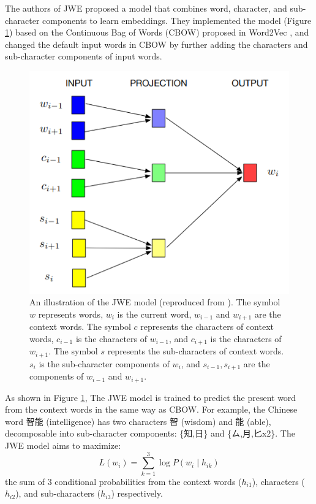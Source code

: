 The authors of JWE \cite{yu2017joint} proposed a model that combines word, character, and sub-character components to learn embeddings. They implemented the model (Figure \ref{fig:jwe}) based on the Continuous Bag of Words (CBOW) proposed in Word2Vec \cite{mikolov2013efficient}, and changed the default input words in CBOW by further adding the characters and sub-character components of input words.

\begin{figure}[h]
	\centering
	\includegraphics[scale=0.7]{../images/jwe_illustration.png}
	\caption[An illustration of the JWE model (reproduced from \cite{yu2017joint})]{An illustration of the JWE model (reproduced from \cite{yu2017joint}). The symbol $w$ represents words, $w_i$ is the current word, $w_{i-1}$ and $w_{i+1}$ are the context words. The symbol $c$ represents the characters of context words, $c_{i-1}$ is the characters of $w_{i-1}$, and $c_{i+1}$ is the characters of $w_{i+1}$. The symbol $s$ represents the sub-characters of context words. $s_i$ is the sub-character components of $w_i$, and $s_{i-1}, s_{i+1}$ are the components of $w_{i-1}$ and $w_{i+1}$.}
	\label{fig:jwe}
\end{figure}

As shown in Figure \ref{fig:jwe}, The JWE model is trained to predict the present word from the context words in the same way as CBOW. For example, the Chinese word 智能 (intelligence) has two characters 智 (wisdom) and 能 (able), decomposable into sub-character components: \{知,日\} and \{ㄙ,月,匕x2\}. The JWE model aims to maximize:
\begin{equation*}
L(w_i) = \sum_{k=1}^3\log P(w_i\mid h_{ik})
\end{equation*}
the sum of 3 conditional probabilities from the context words ($h_{i1}$), characters ($h_{i2}$), and sub-characters ($h_{i3}$) respectively.

